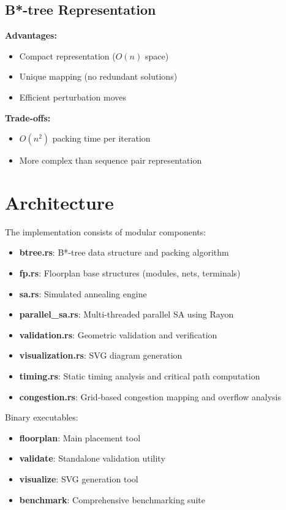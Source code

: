 \documentclass[11pt]{article}
\begin{document}
\subsection{B*-tree Representation}

\textbf{Advantages:}
\begin{itemize}
    \item Compact representation ($O(n)$ space)
    \item Unique mapping (no redundant solutions)
    \item Efficient perturbation moves
\end{itemize}

\textbf{Trade-offs:}
\begin{itemize}
    \item $O(n^2)$ packing time per iteration
    \item More complex than sequence pair representation
\end{itemize}

\section{Architecture}

The implementation consists of modular components:

\begin{itemize}
    \item \textbf{btree.rs}: B*-tree data structure and packing algorithm
    \item \textbf{fp.rs}: Floorplan base structures (modules, nets, terminals)
    \item \textbf{sa.rs}: Simulated annealing engine
    \item \textbf{parallel\_sa.rs}: Multi-threaded parallel SA using Rayon
    \item \textbf{validation.rs}: Geometric validation and verification
    \item \textbf{visualization.rs}: SVG diagram generation
    \item \textbf{timing.rs}: Static timing analysis and critical path computation
    \item \textbf{congestion.rs}: Grid-based congestion mapping and overflow analysis
\end{itemize}

Binary executables:
\begin{itemize}
    \item \textbf{floorplan}: Main placement tool
    \item \textbf{validate}: Standalone validation utility
    \item \textbf{visualize}: SVG generation tool
    \item \textbf{benchmark}: Comprehensive benchmarking suite
\end{itemize}
\end{document}

